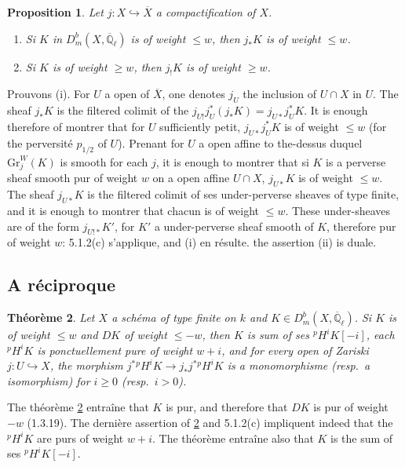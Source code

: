\documentclass[12pt,a4paper]{article}
\theoremstyle{plain}
\newtheorem{theorem}{Th\'{e}or\`{e}me}[section]
\newtheorem{proposition}[theorem]{Proposition}
\theoremstyle{definition}
\newcommand{\into}{\hookrightarrow}
\begin{document}
{{\begin{proposition}\label{prop:5.1.4}
Let $j: X \into \overline{X}$ a compactification of $X$.
\begin{enumerate}
\item[(i)] Si $K$ in $D_{m}^{b}(X, \overline{\mathbb{Q}}_{\ell})$ is of weight $\leq w$, then $j_{*}K$ is of weight $\leq w$.
\item[(ii)] Si $K$ is of weight $\geq w$, then $j_{!}K$ is of weight $\geq w$.
\end{enumerate}
\end{proposition}

Prouvons (i). For $U$ a open of $\overline{X}$, one denotes $j_{U}$ the inclusion of $U \cap X$ in $U$. The sheaf $j_{*}K$ is the filtered colimit of the $j_{U!}j_{U}^{*}(j_{*}K) = j_{U*}j_{U}^{*}K$. It is enough therefore of montrer that for $U$ sufficiently petit, $j_{U*}j_{U}^{*}K$ is of weight $\leq w$ (for the perversit\'{e} $p_{1/2}$ of $U$). Prenant for $U$ a open affine to the-dessus duquel $\mathrm{Gr}_{j}^{W}(K)$ is smooth for each $j$, it is enough to montrer that si $K$ is a perverse sheaf smooth pur of weight $w$ on a open affine $U \cap X$, $j_{U*}K$ is of weight $\leq w$. The sheaf $j_{U*}K$ is the filtered colimit of ses under-perverse sheaves of type finite, and it is enough to montrer that chacun is of weight $\leq w$. These under-sheaves are of the form $j_{U!*}K'$, for $K'$ a under-perverse sheaf smooth of $K$, therefore pur of weight $w$: 5.1.2(c) s'applique, and (i) en r\'{e}sulte. the assertion (ii) is duale.

\subsection{A r\'{e}ciproque}

\begin{theorem}\label{thm:5.2.1}
Let $X$ a sch\'{e}ma of type finite on $k$ and $K \in D_{m}^{b}(X, \overline{\mathbb{Q}}_{\ell})$. Si $K$ is of weight $\leq w$ and $DK$ of weight $\leq -w$, then $K$ is sum of ses ${}^{p}H^{i}K[-i]$, each ${}^{p}H^{i}K$ is ponctuellement pure of weight $w+i$, and for every open of Zariski $j: U \into X$, the morphism $j^{*}{}^{p}H^{i}K \longrightarrow j_{*}j^{*}{}^{p}H^{i}K$ is a monomorphisme (resp.\ a isomorphism) for $i \geq 0$ (resp.\ $i > 0$).
\end{theorem}

The th\'{e}or\`{e}me \ref{thm:5.2.1} entra\^{i}ne that $K$ is pur, and therefore that $DK$ is pur of weight $-w$ (1.3.19). The derni\`{e}re assertion of \ref{thm:5.2.1} and 5.1.2(c) impliquent indeed that the ${}^{p}H^{i}K$ are purs of weight $w+i$. The th\'{e}or\`{e}me entra\^{i}ne also that $K$ is the sum of ses ${}^{p}H^{i}K[-i]$.

}}
\end{document}
